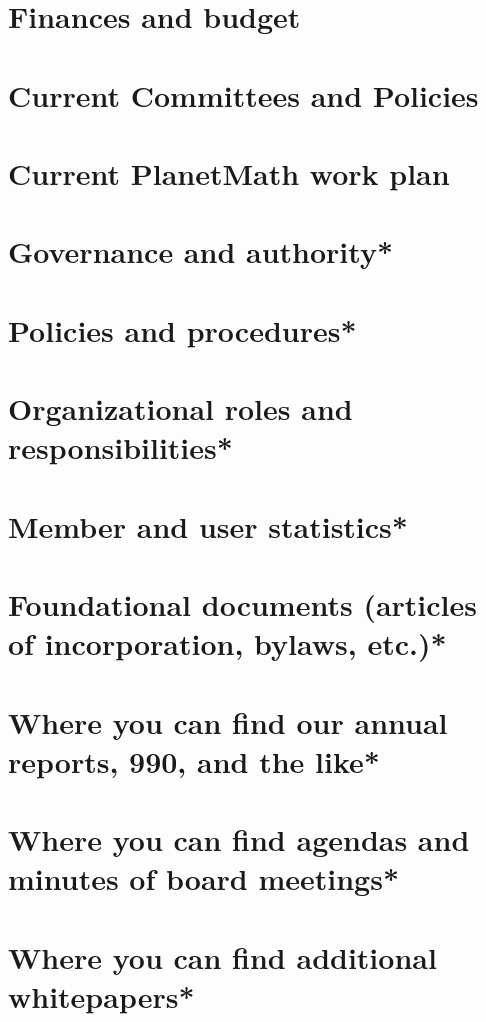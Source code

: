\documentclass[12pt,report]{memoir}
\begin{document}
\section{Finances and budget}


\section{Current Committees and Policies}

%

\section{Current PlanetMath work plan}


\section{Governance and authority*}
\section{Policies and procedures*}
\section{Organizational roles and responsibilities*}
\section{Member and user statistics*}
\section{Foundational documents (articles of incorporation, bylaws, etc.)*}
\section{Where you can find our annual reports, 990, and the like*}
\section{Where you can find agendas and minutes of board meetings*}
\section{Where you can find additional whitepapers*}
\end{document}
